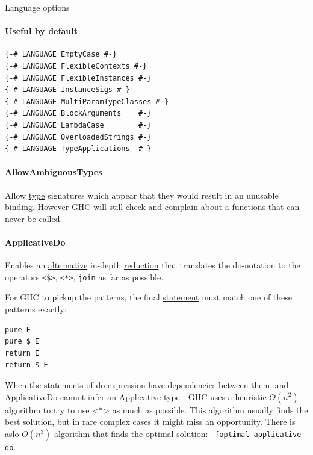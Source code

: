 \documentclass[a4paper,14pt,oneside]{book}
\begin{document}
\label{orga8956d8}Language options

\paragraph{Useful by default}
\label{sec:org1fe386f}
\begin{verbatim}
{-# LANGUAGE EmptyCase #-}
{-# LANGUAGE FlexibleContexts #-}
{-# LANGUAGE FlexibleInstances #-}
{-# LANGUAGE InstanceSigs #-}
{-# LANGUAGE MultiParamTypeClasses #-}
{-# LANGUAGE BlockArguments    #-}
{-# LANGUAGE LambdaCase        #-}
{-# LANGUAGE OverloadedStrings #-}
{-# LANGUAGE TypeApplications  #-}
\end{verbatim}

\paragraph{\label{orga980f59}AllowAmbiguousTypes}
\label{sec:org10fa712}
Allow \hyperref[org4e3af4c]{type} signatures which appear that they would result in an unusable \hyperref[org12009de]{binding}.
However GHC will still check and complain about a \hyperref[org9766947]{functions} that can never be called.

\paragraph{\label{org9927832}ApplicativeDo}
\label{sec:org1f4033b}
Enables an \hyperref[org8057d0c]{alternative} in-depth \hyperref[orgfc61535]{reduction} that translates the do-notation to the operators \texttt{<\$>}, \texttt{<*>}, \texttt{join} as far as possible.

For GHC to pickup the patterns, the final \hyperref[orga5fdde1]{statement} must match one of these patterns exactly:

\begin{verbatim}
pure E
pure $ E
return E
return $ E
\end{verbatim}

When the \hyperref[org3adb458]{statements} of do \hyperref[orgca36393]{expression} have dependencies between them, and \hyperref[org9927832]{ApplicativeDo} cannot \hyperref[org55bfbef]{infer} an \hyperref[orgffb5e0c]{Applicative} \hyperref[org4e3af4c]{type} - GHC uses a heuristic \(O(n^2)\) algorithm to try to use <*> as much as possible. This algorithm usually finds the best solution, but in rare complex cases it might miss an opportunity. There is aslo \(O(n^3)\) algorithm that finds the optimal solution: \texttt{-foptimal-applicative-do}.
\end{document}
